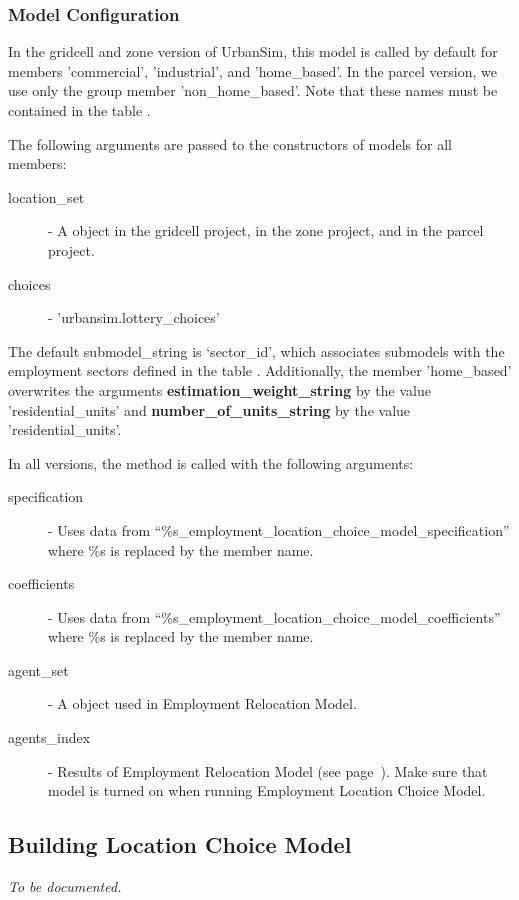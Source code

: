 \subsubsection{Model Configuration}
%
In the gridcell and zone version of UrbanSim, this model is called by default for members 'commercial', 
'industrial', and 'home_based'.
In the parcel version, we use only the group member 'non_home_based'. Note that 
these names must be contained in the table . 

The following arguments are passed to the constructors of models for all members:
\begin{description}
\item[location_set] - A  object in the gridcell project,  in the zone project,
  and  in the parcel project.
\item[choices] - 'urbansim.lottery_choices'
\end{description}
The default submodel_string is `sector_id', which associates submodels with the employment sectors defined in the table .  
Additionally, the member 'home_based' overwrites the arguments {\bf estimation_weight_string} by the value 'residential_units' 
and {\bf number_of_units_string} by the value 'residential_units'.

In all versions, the  method is called with the following arguments:
\begin{description}
\item[specification] - Uses data from
  ``\%s_employment_location_choice_model_specification'' where \%s is replaced by the member name.
\item[coefficients] \coefficientsindex - Uses data from ``\%s_employment_location_choice_model_coefficients'' 
    where \%s is replaced by the member name.
\item[agent_set] - A  object used in Employment Relocation Model.
\item[agents_index] - Results of Employment Relocation Model (see page~\pageref{page:ERM}). 
Make sure that model is turned on 
when running Employment Location Choice Model.
\end{description}
 
%

\subsection{Building Location Choice Model}
\label{sec:BLCM}
{\it To be documented.}


